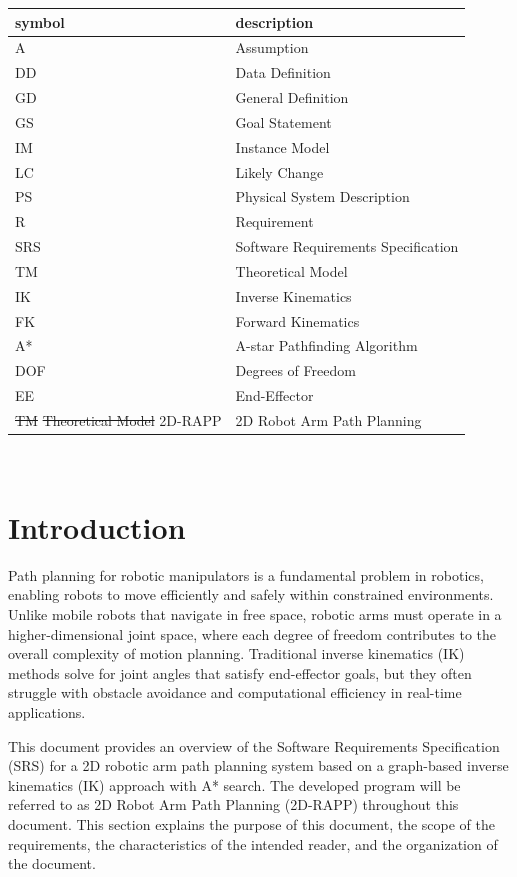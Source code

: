 \documentclass[12pt]{article}
\makeatletter
\providecommand{\DIFdeltex}[1]{{\protect\color{red}\sout{#1}}} %
\providecommand{\DIFdelbegin}{} %
\providecommand{\DIFdelend}{} %
\providecommand{\DIFdel}[1]{\texorpdfstring{\DIFdeltex{#1}}{}} %
\newcommand{\DIFscaledelfig}{0.5}
\newlength{\DIFdelgraphicswidth} %
\newlength{\DIFdelgraphicsheight} %
\newcommand{\DIFdelincludegraphics}[2][]{%
\sbox{\DIFdelgraphicsbox}{\DIFOincludegraphics[#1]{#2}}%
\settoboxwidth{\DIFdelgraphicswidth}{\DIFdelgraphicsbox} %
\settoboxtotalheight{\DIFdelgraphicsheight}{\DIFdelgraphicsbox} %
\scalebox{\DIFscaledelfig}{%
\parbox[b]{\DIFdelgraphicswidth}{\usebox{\DIFdelgraphicsbox}\\[-\baselineskip] \rule{\DIFdelgraphicswidth}{0em}}\llap{\resizebox{\DIFdelgraphicswidth}{\DIFdelgraphicsheight}{%
\setlength{\unitlength}{\DIFdelgraphicswidth}%
\begin{picture}(1,1)%
\thicklines\linethickness{2pt} %
{\color[rgb]{1,0,0}\put(0,0){\framebox(1,1){}}}%
{\color[rgb]{1,0,0}\put(0,0){\line( 1,1){1}}}%
{\color[rgb]{1,0,0}\put(0,1){\line(1,-1){1}}}%
\end{picture}%
}\hspace*{3pt}}} %
} %
\DeclareRobustCommand{\DIFdelbegin}{\DIFOdelbegin \let\includegraphics\DIFdelincludegraphics} %
\DeclareRobustCommand{\DIFdelend}{\DIFOaddend \let\includegraphics\DIFOincludegraphics} %
\let\sout@orig\sout %
\renewcommand{\sout}[1]{\ifmmode\text{\sout@orig{\ensuremath{#1}}}\else\sout@orig{#1}\fi} %
\makeatother
\begin{document}
\renewcommand{\arraystretch}{1.2}
\begin{tabular}{l l} 
  \toprule		
  \textbf{symbol} & \textbf{description}\\
  \midrule 
  A & Assumption\\
  DD & Data Definition\\
  GD & General Definition\\
  GS & Goal Statement\\
  IM & Instance Model\\
  LC & Likely Change\\
  PS & Physical System Description\\
  R & Requirement\\
  SRS & Software Requirements Specification\\
  TM & Theoretical Model\\
  IK & Inverse Kinematics \\
  FK & Forward Kinematics \\
  A* & A-star Pathfinding Algorithm \\
  DOF & Degrees of Freedom \\
  EE & End-Effector \\
  \DIFdelbegin \DIFdel{TM }%
\DIFdel{Theoretical Model}%
\DIFdelend 2D-RAPP & 2D Robot Arm Path Planning\\
  \bottomrule
\end{tabular}\\





\section{Introduction}
Path planning for robotic manipulators is a fundamental problem in robotics, enabling robots to move efficiently and safely within constrained environments. Unlike mobile robots that navigate in free space, robotic arms must operate in a higher-dimensional joint space, where each degree of freedom contributes to the overall complexity of motion planning. Traditional inverse kinematics (IK) methods solve for joint angles that satisfy end-effector goals, but they often struggle with obstacle avoidance and computational efficiency in real-time applications.

This document provides an overview of the Software Requirements Specification (SRS) for a 2D robotic arm path planning system based on a graph-based inverse kinematics (IK) approach with A* search. The developed program will be referred to as 2D Robot Arm Path Planning (2D-RAPP) throughout this document. This section explains the purpose of this document, the scope of the requirements, the characteristics of the intended reader, and the organization of the document.
\end{document}
